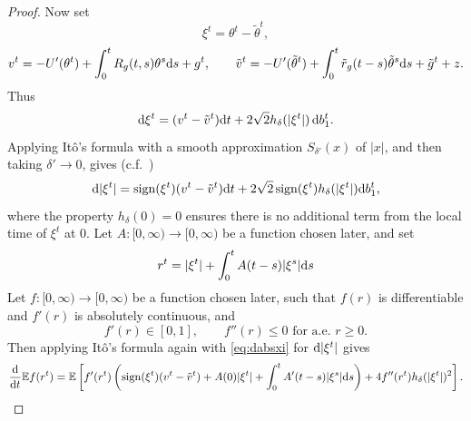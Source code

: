 \begin{proof}
Now set
\[\xi^t=\theta^t-\tilde \theta^t,\]
\[v^t=-U'(\theta^t)+\int_0^t R_g(t,s)\theta^s \mathrm{d} s+g^t,
\qquad \tilde v^t=-U'(\tilde \theta^t)+\int_0^t \tilde r_g(t-s)
\tilde \theta^s \mathrm{d} s+\tilde g^t+z.\]
Thus
\[\mathrm{d} \xi^t=(v^t-\tilde v^t)\mathrm{d} t+2\sqrt{2}h_\delta(|\xi^t|)\,\mathrm{d} b_1^t.\]
Applying It\^o's formula with a smooth approximation $S_{\delta'}(x)$
of $|x|$, and then taking $\delta' \to 0$, gives
(c.f.\ \cite[Eq.\ (4.4)]{eberle2019sticky})
\begin{equation}\label{eq:dabsxi}
\mathrm{d}|\xi^t|=\operatorname{sign}(\xi^t)(v^t-\tilde v^t)\mathrm{d} t
+2\sqrt{2}\operatorname{sign}(\xi^t)h_\delta(|\xi^t|)\mathrm{d} b_1^t,
\end{equation}
where the property $h_\delta(0)=0$ ensures there is no additional term from the
local time of $\xi^t$ at 0.  
Let $A:[0,\infty) \to [0,\infty)$ be a function chosen later, and set
\[r^t=|\xi^t|+\int_0^t A(t-s)|\xi^s|\mathrm{d} s\]
Let $f:[0,\infty) \to [0,\infty)$ be a function chosen later, such that
$f(r)$ is differentiable and $f'(r)$ is absolutely continuous, and
\[f'(r) \in [0,1], \qquad f''(r) \leq 0 \text{ for a.e. } r \geq 0.\]
Then applying It\^o's formula again with \eqref{eq:dabsxi} for $\mathrm{d}|\xi^t|$ gives
\begin{equation}\label{eq:itobound1}
\frac{\mathrm{d}}{\mathrm{d} t}
\mathbb{E} f(r^t)=\mathbb{E}\left[f'(r^t)\left(\operatorname{sign}(\xi^t)(v^t-\tilde v^t)+A(0)|\xi^t|
+\int_0^t A'(t-s)|\xi^s|\mathrm{d} s\right)+4f''(r^t)h_\delta(|\xi^t|)^2\right].
\end{equation}


\end{proof}
